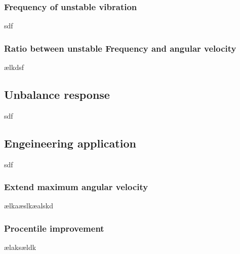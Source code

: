 \subsubsection{Frequency of unstable vibration}
sdf
\subsubsection{Ratio between unstable Frequency and angular velocity}
ælkdsf
\subsection{Unbalance response}
sdf
\subsection{Engeineering application}
sdf
\subsubsection{Extend maximum angular velocity}
ælkaæslkæalskd
\subsubsection{Procentile improvement}
ælaksældk